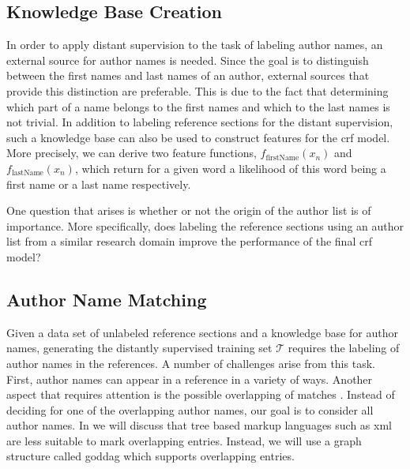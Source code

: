 \subsection{Knowledge Base Creation}\label{subsec:ae-knowledge-base-creation}

In order to apply distant supervision to the task of labeling author names, an external source for author names is needed.
Since the goal is to distinguish between the first names and last names of an author, external sources that provide this distinction are preferable.
This is due to the fact that determining which part of a name belongs to the first names and which to the last names is not trivial.
In addition to labeling reference sections for the distant supervision, such a knowledge base can also be used to construct features for the \gls{crf} model.
More precisely, we can derive two feature functions, $f_{\text{firstName}}(x_n)$ and $f_{\text{lastName}}(x_n)$, which return for a given word a likelihood of this word being a first name or a last name respectively.

\bigskip

One question that arises is whether or not the origin of the author list is of importance.
More specifically, does labeling the reference sections using an author list from a similar research domain improve the performance of the final \gls{crf} model?

\subsection{Author Name Matching}\label{subsec:ae-author-name-matching}

Given a data set of unlabeled reference sections and a knowledge base for author names, generating the distantly supervised training set $\mathcal{T}$ requires the labeling of author names in the references.
A number of challenges arise from this task.
First, author names can appear in a reference in a variety of ways.
Another aspect that requires attention is the possible overlapping of matches .
Instead of deciding for one of the overlapping author names, our goal is to consider all author names.
In  we will discuss that tree based markup languages such as \gls{xml} are less suitable to mark overlapping entries.
Instead, we will use a graph structure called \gls{goddag} which supports overlapping entries.

